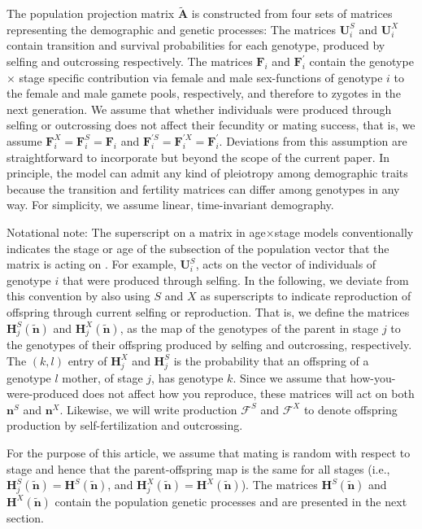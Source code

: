 \documentclass[11pt]{article}
\def\mbf#1{\mathbf{#1}}
\def\mcal#1{\mathcal{#1}}
\begin{document}
The population projection matrix $\tilde{\mbf{A}}$ is constructed from four sets of matrices representing the demographic and genetic processes: The matrices $\mbf{U}^{S}_{i}$ and $\mbf{U}^{X}_{i}$ contain transition and survival probabilities for each genotype, produced by selfing and outcrossing respectively. The matrices $\mbf{F}_{i}$ and $\mbf{F}^{\prime}_{i}$ contain the genotype $\times$ stage specific contribution via female and male sex-functions of genotype $i$ to the female and male gamete pools, respectively, and therefore to zygotes in the next generation. We assume that whether individuals were produced through selfing or outcrossing does not affect their fecundity or mating success, that is, we assume  $\mbf{F}^X_{i}=\mbf{F}^S_{i}=\mbf{F}_{i}$ and $\mbf{F}^{\prime S}_{i}=\mbf{F}^{\prime X}_{i}=\mbf{F}^{\prime}_{i}$. Deviations from this assumption are straightforward to incorporate but beyond the scope of the current paper. In principle, the model can admit any kind of pleiotropy among demographic traits because the transition and fertility matrices can differ among genotypes in any way. For simplicity, we assume linear, time-invariant demography.

Notational note: The superscript on a matrix in age$\times$stage models conventionally indicates the stage or age of the subsection of the population vector that the matrix is acting on \citep{CaswellEtAl2018}. For example, $\mbf{U}^{S}_{i}$, acts on the vector of individuals of genotype $i$ that were produced through selfing. In the following, we deviate from this convention by also using $S$ and $X$ as superscripts to indicate reproduction of offspring through current selfing or reproduction. That is,  we define the matrices $\mbf{H}^S_{j}(\tilde{\mbf{n}})$ and $\mbf{H}^X_{j}(\tilde{\mbf{n}})$, as the map of the genotypes of the parent in stage $j$ to the genotypes of their offspring produced by selfing and outcrossing, respectively. The $(k, l)$ entry of $\mbf{H}^{X}_{j}$ and $\mbf{H}^{S}_{j}$ is the probability that an offspring of a genotype $l$ mother, of stage $j$, has genotype $k$. Since we assume that how-you-were-produced does not affect how you reproduce, these matrices will act on both $\mbf{n}^{S}$ and $\mbf{n}^{X}$. Likewise, we will write production $\mcal{F}^S$ and $\mcal{F}^X$ to denote offspring production by self-fertilization and outcrossing. 

For the purpose of this article, we assume that mating is random with respect to stage and hence that the parent-offspring map is the same for all stages (i.e., $\mbf{H}^S_{j}(\tilde{\mbf{n}}) = \mbf{H}^S(\tilde{\mbf{n}})$, and $\mbf{H}^X_{j}(\tilde{\mbf{n}}) = \mbf{H}^X(\tilde{\mbf{n}})$). The matrices $\mbf{H}^S(\tilde{\mbf{n}})$ and $\mbf{H}^X(\tilde{\mbf{n}})$ contain the population genetic processes and are presented in the next section.
\end{document}

